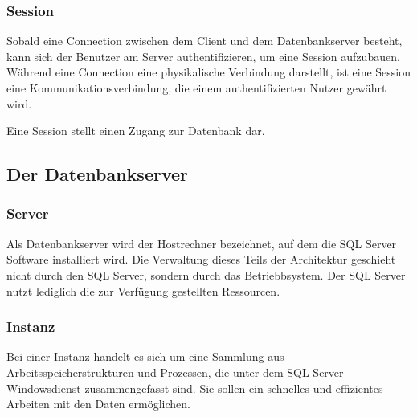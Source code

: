         \subsubsection{Session}
          Sobald eine Connection zwischen dem Client und dem Datenbankserver
          besteht, kann sich der Benutzer am Server authentifizieren, um eine
          Session aufzubauen. Während eine Connection eine physikalische
          Verbindung darstellt, ist eine Session eine Kommunikationsverbindung,
          die einem authentifizierten Nutzer gewährt wird.
          \begin{merke}
            Eine Session stellt einen Zugang zur Datenbank dar.
          \end{merke}
      \subsection{Der Datenbankserver}
        \subsubsection{Server}
          Als Datenbankserver wird der Hostrechner bezeichnet, auf dem
          die SQL Server Software installiert wird. Die Verwaltung dieses Teils der
          Architektur geschieht nicht durch den SQL Server, sondern durch das
          Betriebbsystem. Der SQL Server nutzt lediglich die zur Verfügung
          gestellten Ressourcen.
        \subsubsection{Instanz}
          Bei einer Instanz handelt es sich um eine Sammlung aus
          Arbeitsspeicherstrukturen und Prozessen, die unter dem SQL-Server
          Windowsdienst zusammengefasst sind. Sie sollen ein schnelles und
          effizientes Arbeiten mit den Daten ermöglichen. 
          
